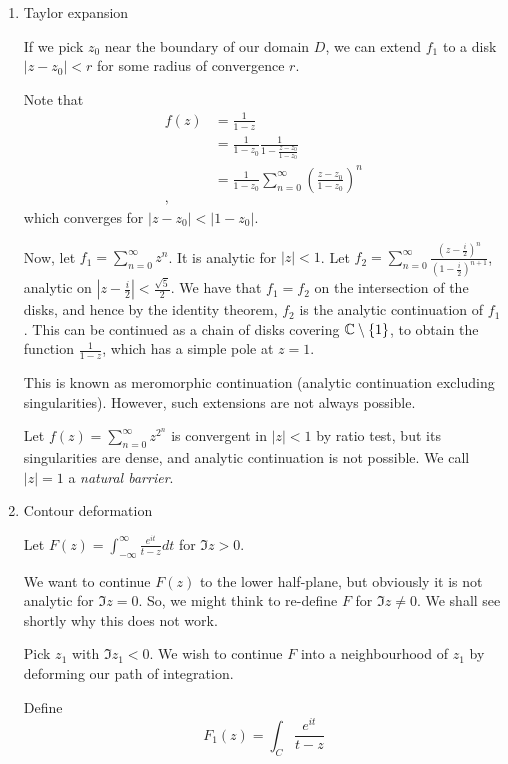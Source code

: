 \documentclass[a4paper]{article}
\begin{document}
\begin{enumerate}
	\item Taylor expansion

		If we pick $z_0$ near the boundary of our domain $D$, we can extend  $f_1$ to a disk $|z-z_0| < r$ for some radius of convergence $r$.

	\begin{eg} Note that
		\begin{align*}
			f(z) &= \frac{1}{1-z} \\
			&= \frac{1}{1-z_0} \frac{1}{1-\frac{z-z_0}{1-z_0}} \\
			&= \frac{1}{1-z_0} \sum_{n=0}^{\infty} \left(\frac{z-z_0}{1-z_0}\right)^{n}\\
		,\end{align*} which converges for $|z-z_0| < |1-z_0|$.

		Now, let $f_1 = \sum_{n=0}^{\infty} z^{n}$. It is analytic for $|z|<1$. Let $f_2 = \sum_{n=0}^{\infty} \frac{(z-\frac{i}{2})^{n}}{(1-\frac{i}{2})^{n+1}}$, analytic on $|z-\frac{i}{2}| < \frac{\sqrt{5} }{2} $. We have that  $f_1 = f_2$ on the intersection of the disks, and hence by the identity theorem, $f_2$ is the analytic continuation of $f_1$. This can be continued as a chain of disks covering $\mathbb{C} \setminus \{1\} $, to obtain the function $\frac{1}{1-z}$, which has a simple pole at $z=1$. 	
	\end{eg}
	This is known as meromorphic continuation (analytic continuation excluding singularities).
	However, such extensions are not always possible.

	\begin{eg}
		Let $f(z) = \sum_{n=0}^{\infty} z^{2^{n}}$ is convergent in $|z|<1$ by ratio test, but its singularities are dense, and analytic continuation is not possible. We call $|z|=1$ a \textit{natural barrier}.
	\end{eg}
	\item Contour deformation
		\begin{eg}
		Let $F(z) = \int_{-\infty}^{\infty} \frac{e^{it}}{t-z} dt$ for $\Im z > 0$.

		We want to continue $F(z)$ to the lower half-plane, but obviously it is not analytic for  $\Im z = 0$. So, we might think to re-define $F$ for $\Im z \neq 0$. We shall see shortly why this does not work.

		Pick  $z_1$ with $\Im z_1 <0$. We wish to continue $F$ into a neighbourhood of $z_1$ by deforming our path of integration. 

\begin{figure}[ht]
    \centering
\end{figure}
		Define \[
			F_1(z) = \int_{C} \frac{e^{it}}{t-z}
		\] 


\end{eg}
\end{enumerate}
\end{document}
